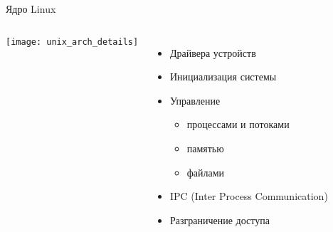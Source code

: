 \begin{frame}[fragile]{Ядро Linux}
    \begin{columns}
        \texttt{[image: unix\_arch\_details]}
	\begin{itemize}
		\item Драйвера устройств
		\item Инициализация системы
		\item Управление
                    \begin{itemize}
                        \item процессами и потоками
                        \item памятью
                        \item файлами
                    \end{itemize}
		\item IPC (Inter Process Communication)
		\item Разграничение доступа
	\end{itemize}
    \end{columns}
\end{frame}
